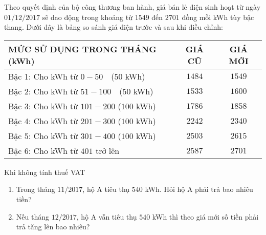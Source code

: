 \begin{bt}%
Theo quyết định của bộ công thương ban hành, giá bán lẻ điện sinh hoạt từ ngày $01/12/2017$ sẽ dao động trong khoảng từ $1549$ đến $2701$ đồng mỗi kWh tùy bậc thang. Dưới đây là bảng so sánh giá điện trước và sau khi điều chỉnh:
\begin{center}
\begin{tabular}{|l|c|c|}
\hline
\textbf{MỨC SỬ DỤNG TRONG THÁNG (kWh)} & \textbf{GIÁ CŨ} & \textbf{GIÁ MỚI}\\
\hline
Bậc 1: Cho kWh từ \quad $0-50$\quad\ \  \quad ($50$ kWh) & $1484$ & $1549$\\
\hline
Bậc 2: Cho kWh từ \quad $51-100$\ \  \quad ($50$ kWh) & $1533$ & $1600$\\
\hline
Bậc 3: Cho kWh từ \quad $101-200$ \quad ($100$ kWh) & $1786$ & $1858$\\
\hline
Bậc 4: Cho kWh từ \quad $201-300$ \quad ($100$ kWh) & $2242$ & $2340$\\
\hline
Bậc 5: Cho kWh từ \quad $301-400$ \quad ($100$ kWh) & $2503$ & $2615$\\
\hline
Bậc 6: Cho kWh từ \quad $401$ trở lên & $2587$ & $2701$\\
\hline
\end{tabular}
\end{center}
Khi không tính thuế VAT
\begin{enumerate}
\item Trong tháng $11/2017$, hộ A tiêu thụ $540$ kWh. Hỏi hộ A phải trả bao nhiêu tiền?
\item Nếu tháng $12/2017$, hộ A vẫn tiêu thụ $540$ kWh thì theo giá mới số tiền phải trả tăng lên bao nhiêu?
\end{enumerate}
\end{bt}

